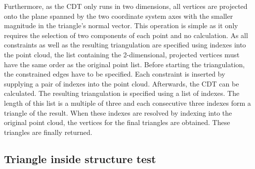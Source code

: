 Furthermore, as the CDT only runs in two dimensions, all vertices are projected onto the plane spanned by the two coordinate system axes with the smaller magnitude in the triangle's normal vector.
This operation is simple as it only requires the selection of two components of each point and no calculation.
As all constraints as well as the resulting triangulation are specified using indexes into the point cloud, the list containing the 2-dimensional, projected vertices must have the same order as the original point list.
Before starting the triangulation, the constrained edges have to be specified.
Each constraint is inserted by supplying a pair of indexes into the point cloud.
Afterwards, the CDT can be calculated.
The resulting triangulation is specified using a list of indexes.
The length of this list is a multiple of three and each consecutive three indexes form a triangle of the result.
When these indexes are resolved by indexing into the original point cloud, the vertices for the final triangles are obtained.
These triangles are finally returned.


\subsection{Triangle inside structure test}
\label{sec:triangle_inside_test}

